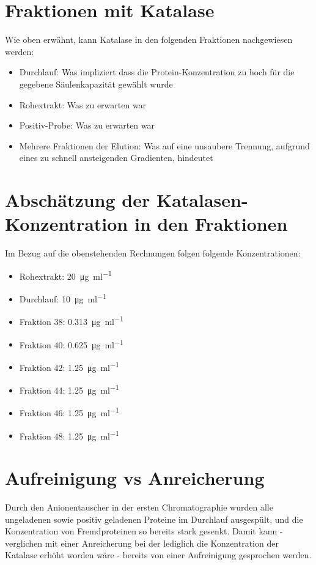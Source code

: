 \documentclass[a4paper,german]{scrreprt}
\begin{document}
\section{Fraktionen mit Katalase}

Wie oben erwähnt, kann Katalase in den folgenden Fraktionen nachgewiesen
werden:

\begin{itemize}
	\item Durchlauf: Was impliziert dass die Protein-Konzentration zu hoch
		für die gegebene Säulenkapazität gewählt wurde
	\item Rohextrakt: Was zu erwarten war
	\item Positiv-Probe: Was zu erwarten war
	\item Mehrere Fraktionen der Elution: Was auf eine unsaubere Trennung,
		aufgrund eines zu schnell ansteigenden Gradienten, hindeutet
\end{itemize}

\section{Abschätzung der Katalasen-Konzentration in den Fraktionen}

Im Bezug auf die obenstehenden Rechnungen folgen folgende Konzentrationen:
\begin{itemize}
	\item Rohextrakt: \SI{20}{\ug \per \ml}
	\item Durchlauf: \SI{10}{\ug \per \ml}
	\item Fraktion 38: \SI{0.313}{\ug \per \ml}
	\item Fraktion 40: \SI{0.625}{\ug \per \ml}
	\item Fraktion 42: \SI{1.25}{\ug \per \ml}
	\item Fraktion 44: \SI{1.25}{\ug \per \ml}
	\item Fraktion 46: \SI{1.25}{\ug \per \ml}
	\item Fraktion 48: \SI{1.25}{\ug \per \ml}
\end{itemize}

\section{Aufreinigung vs Anreicherung}

Durch den Anionentauscher in der ersten Chromatographie wurden alle ungeladenen
sowie positiv geladenen Proteine im Durchlauf ausgespült, und die Konzentration
von Fremdproteinen so bereits stark gesenkt. Damit kann - verglichen mit einer
Anreicherung bei der lediglich die Konzentration der Katalase erhöht worden
wäre - bereits von einer Aufreinigung gesprochen werden.
\end{document}
